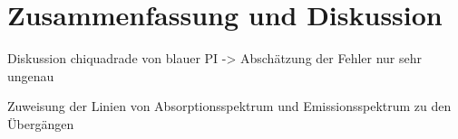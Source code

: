 \section{Zusammenfassung und Diskussion}

Diskussion chiquadrade von blauer PI -> Abschätzung der Fehler nur sehr ungenau

Zuweisung der Linien von Absorptionsspektrum und Emissionsspektrum zu den Übergängen 